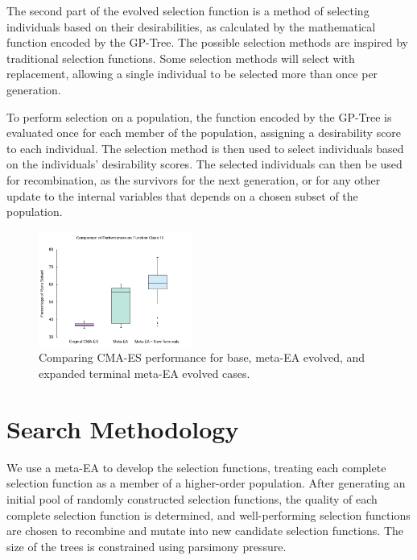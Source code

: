 \documentclass[sigconf]{acmart}
\begin{document}
The second part of the evolved selection function is a method of selecting individuals based on their desirabilities, as calculated by the mathematical function encoded by the GP-Tree. The possible selection methods are inspired by traditional selection functions. Some selection methods will select with replacement, allowing a single individual to be selected more than once per generation. 

To perform selection on a population, the function encoded by the GP-Tree is evaluated once for each member of the population, assigning a desirability score to each individual. The selection method is then used to select individuals based on the individuals' desirability scores. The selected individuals can then be used for recombination, as the survivors for the next generation, or for any other update to the internal variables that depends on a chosen subset of the population.


\begin{figure}
	\centering
	\includegraphics[width=0.45\textwidth]{terminalPerformanceComp}
	\caption{Comparing CMA-ES performance for base, meta-EA evolved, and expanded terminal meta-EA evolved cases.}
	\label{fig:terminalPerformanceComp}
\end{figure}

\section{Search Methodology}
\label{Search Methodology}

We use a meta-EA to develop the selection functions, treating each complete selection function as a member of a higher-order population. After generating an initial pool of randomly constructed selection functions, the quality of each complete selection function is determined, and well-performing selection functions are chosen to recombine and mutate into new candidate selection functions. The size of the trees is constrained using parsimony pressure.
\end{document}
